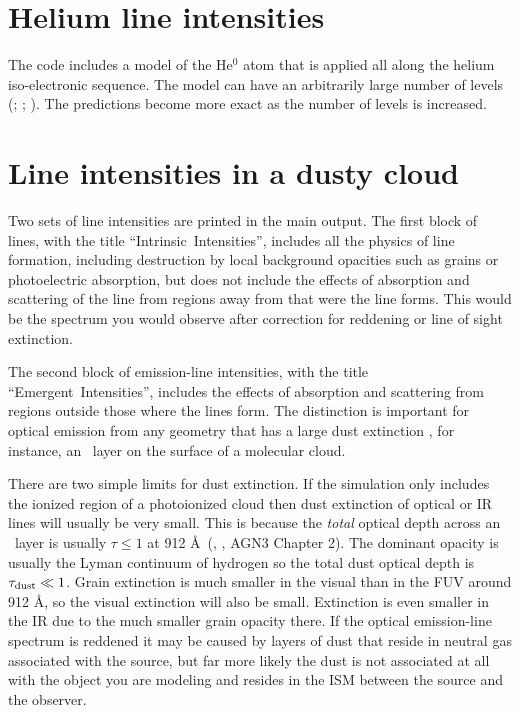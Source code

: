 \section{Helium line intensities}

The code includes a model of the He$^0$ atom that is applied all along the
helium iso-electronic sequence.
The model can have an arbitrarily large
number of levels (\citealp{Bauman2005}; \citealp{Porter2005}; \citealp{PorterFerland2007}).
The predictions become more exact as the number of levels is
increased.

\section{Line intensities in a dusty cloud}
\label{sec:LineIntensitiesDustyCloud}

Two sets of line intensities are printed in the main output.
The first block of lines,
with the title ``Intrinsic~Intensities'',
includes all the physics of line
formation, including destruction by local background opacities such
as grains or photoelectric absorption, 
but does not include the effects of absorption and scattering
of the line from regions away from that were the line forms. 
This would
be the spectrum you would observe after correction for reddening or line
of sight extinction.

The second block of emission-line intensities, with the title
``Emergent~Intensities'',
includes the effects of absorption and scattering from regions
outside those where the lines form.
The distinction is important for optical emission from any geometry that has a large dust extinction
 \Av, for instance, an \hplus\ layer on the surface of a molecular cloud.

There are two simple limits for dust extinction.
If the simulation only includes the ionized region of a photoionized cloud
then dust extinction of optical or IR lines will usually be very small.  
This is because the \emph{total} optical depth across an \hplus\ layer is usually $\tau \leq 1$
at 912 \AA\ (\citealt{BFM}, \citealt{Bottorff1998}, AGN3 Chapter 2).  
The dominant opacity is usually the Lyman continuum of hydrogen so the total
dust optical depth is  $\tau_{\rm dust} \ll 1$.
Grain extinction is much smaller in the visual than in the FUV 
around 912 \AA, so the visual extinction will also be small.
Extinction is even smaller in the IR due to the much smaller grain
opacity there.
If the optical emission-line spectrum is reddened it may be caused 
by layers of dust that reside in neutral gas associated with the source,
but far more likely the dust is not associated at all with the object you are modeling
and resides in the ISM between the source and the observer.

